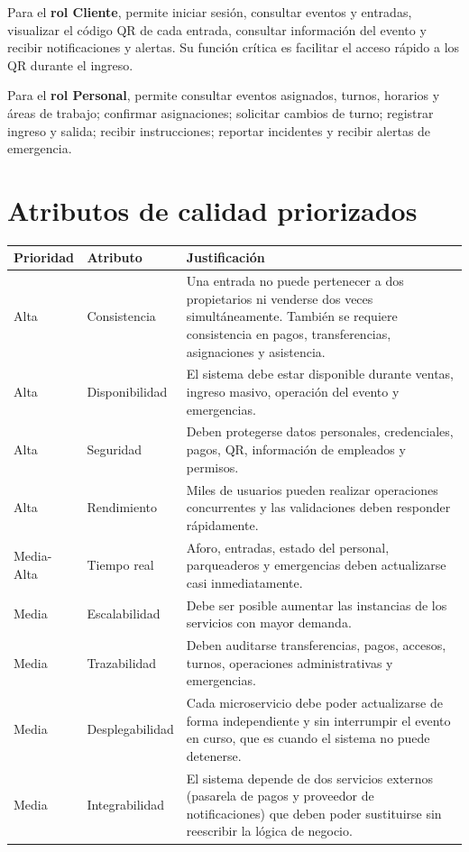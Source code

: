 \documentclass[12pt,a4paper]{article}
\begin{document}
Para el \textbf{rol Cliente}, permite iniciar sesión, consultar eventos y entradas, visualizar el
código QR de cada entrada, consultar información del evento y recibir notificaciones y alertas. Su
función crítica es facilitar el acceso rápido a los QR durante el ingreso.

Para el \textbf{rol Personal}, permite consultar eventos asignados, turnos, horarios y áreas de
trabajo; confirmar asignaciones; solicitar cambios de turno; registrar ingreso y salida; recibir
instrucciones; reportar incidentes y recibir alertas de emergencia.

\section{Atributos de calidad priorizados}

\begin{longtable}{p{2cm}p{3cm}p{9cm}}
\toprule
\textbf{Prioridad} & \textbf{Atributo} & \textbf{Justificación}\\
\midrule
Alta & Consistencia & Una entrada no puede pertenecer a dos propietarios ni venderse dos veces simultáneamente. También se requiere consistencia en pagos, transferencias, asignaciones y asistencia.\\
Alta & Disponibilidad & El sistema debe estar disponible durante ventas, ingreso masivo, operación del evento y emergencias.\\
Alta & Seguridad & Deben protegerse datos personales, credenciales, pagos, QR, información de empleados y permisos.\\
Alta & Rendimiento & Miles de usuarios pueden realizar operaciones concurrentes y las validaciones deben responder rápidamente.\\
Media-Alta & Tiempo real & Aforo, entradas, estado del personal, parqueaderos y emergencias deben actualizarse casi inmediatamente.\\
Media & Escalabilidad & Debe ser posible aumentar las instancias de los servicios con mayor demanda.\\
Media & Trazabilidad & Deben auditarse transferencias, pagos, accesos, turnos, operaciones administrativas y emergencias.\\
Media & Desplegabilidad & Cada microservicio debe poder actualizarse de forma independiente y sin interrumpir el evento en curso, que es cuando el sistema no puede detenerse.\\
Media & Integrabilidad & El sistema depende de dos servicios externos (pasarela de pagos y proveedor de notificaciones) que deben poder sustituirse sin reescribir la lógica de negocio.\\

\end{longtable}
\end{document}
